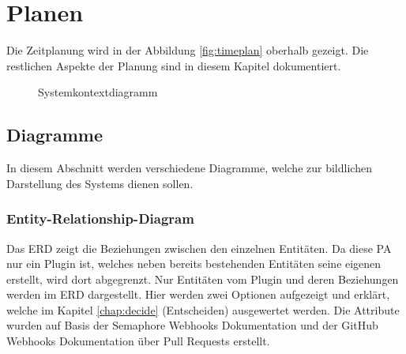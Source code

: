 \chapter{Planen}

Die Zeitplanung wird in der Abbildung \ref{fig:timeplan} oberhalb gezeigt. Die restlichen Aspekte der Planung sind in diesem Kapitel dokumentiert.

\begin{figure}[H]
  \begin{center}
  \end{center}
  \caption[\enquote{Systemkontextdiagramm} erstellt mit Tikz UML]{Systemkontextdiagramm}
  \label{fig:systemcontext}
\end{figure}

\section{Diagramme}
In diesem Abschnitt werden verschiedene Diagramme, welche zur bildlichen Darstellung des Systems dienen sollen.
\subsection{Entity-Relationship-Diagram}
Das ERD zeigt die Beziehungen zwischen den einzelnen Entitäten. Da diese PA nur ein Plugin ist, welches neben
bereits bestehenden Entitäten seine eigenen erstellt, wird dort abgegrenzt. Nur Entitäten vom Plugin und
deren Beziehungen werden im ERD dargestellt. \newline
Hier werden zwei Optionen aufgezeigt und erklärt, welche im Kapitel \ref{chap:decide} (Entscheiden) ausgewertet werden. \newline
Die Attribute wurden auf Basis der Semaphore Webhooks Dokumentation \cite{semaphore_webhooks} und der GitHub Webhooks
Dokumentation über Pull Requests \cite{github_webhooks_pr} erstellt.

